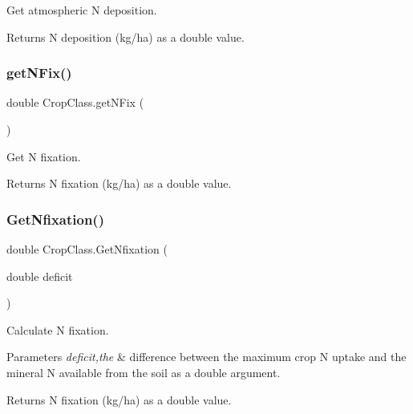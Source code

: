 Get atmospheric N deposition. 

\begin{DoxyReturn}{Returns}
N deposition (kg/ha) as a double value. 
\end{DoxyReturn}
\mbox{\label{class_crop_class_a47aa8037798f19366b41912f45007df4}} 
\subsubsection{\texorpdfstring{getNFix()}{getNFix()}}
{\footnotesize\ttfamily double Crop\+Class.\+get\+N\+Fix (\begin{DoxyParamCaption}{ }\end{DoxyParamCaption})\hspace{0.3cm}{\ttfamily [inline]}}



Get N fixation. 

\begin{DoxyReturn}{Returns}
N fixation (kg/ha) as a double value. 
\end{DoxyReturn}
\mbox{\label{class_crop_class_acc491b6f718ea6965eeb1a93228176b3}} 
\subsubsection{\texorpdfstring{GetNfixation()}{GetNfixation()}}
{\footnotesize\ttfamily double Crop\+Class.\+Get\+Nfixation (\begin{DoxyParamCaption}\item[{double}]{deficit }\end{DoxyParamCaption})\hspace{0.3cm}{\ttfamily [inline]}}



Calculate N fixation. 


\begin{DoxyParams}{Parameters}
{\em deficit,the} & difference between the maximum crop N uptake and the mineral N available from the soil as a double argument. \\
\hline
\end{DoxyParams}
\begin{DoxyReturn}{Returns}
N fixation (kg/ha) as a double value. 
\end{DoxyReturn}
\mbox{\label{class_crop_class_aeb2eee357240757e0e68099cffea54fa}} 
